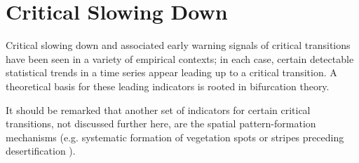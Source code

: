 \section{Critical Slowing Down}
\label{sec:csd}

Critical slowing down and associated early warning signals of critical transitions \cite{schefferCriticalTransitionsNature2009, boettigerEarlyWarningSignals2013, georgeEarlyWarningSignals2021} have been seen in a variety of empirical contexts; in each case, certain detectable statistical trends in a time series appear leading up to a critical transition. A theoretical basis for these leading indicators is rooted in bifurcation theory. 

It should be remarked that another set of indicators for certain critical transitions, not discussed further here, are the spatial pattern-formation mechanisms (e.g. systematic formation of vegetation spots or stripes preceding desertification \cite{dakosSlowingSpatiallyPatterned2011, bastiaansenStablePlanarVegetation2019}). 






